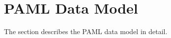 
\section{PAML Data Model}\label{sec:model}

The section describes the PAML data model in detail.  


